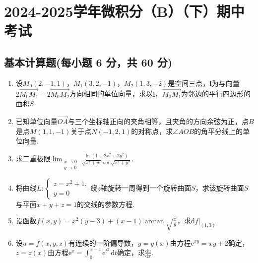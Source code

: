 \documentclass[../main.tex]{subfiles}
\begin{document}
\chapter{2024-2025学年微积分（B）（下）期中考试}

\section{基本计算题(每小题 6 分，共 60 分)}
\begin{enumerate}
    \item 设$M_{0}(2,-1,1)$，$M_{1}(3,2,-1)$，$M_{2}(1,3,-2)$是空间三点，$\boldsymbol
              {l}$为与向量$2\overrightarrow{M_0M_1}-2\overrightarrow{M_0M_2}$方向相同的单位向量，求以$\boldsymbol
              {l}$，$\overrightarrow{M_0M_1}$为邻边的平行四边形的面积$S$.
          \vspace{10em}

    \item 已知单位向量$\overrightarrow{OA}$与三个坐标轴正向的夹角相等，且夹角的方向余弦为正，点$B$是点$M
              (1,1,-1)$关于点$N(-1,2,1)$的对称点，求$\angle AOB$的角平分线上的单位向量.
          \vspace{10em}

    \item 求二重极限$\lim_{\substack{x\to 0 \\ y\to 0}}\frac{\ln\left(1+2x^{2}+2y^{2}\right)}{\sqrt{x^{2}+y^{2}}\sin\sqrt{x^{2}+y^{2}}}$.
          \vspace{10em}

    \item 将曲线$L:
              \begin{cases}
                  z=x^{2}+1, \\
                  y=0
              \end{cases}$绕$z$轴旋转一周得到一个旋转曲面$S$，求该旋转曲面$S$与平面$x+y+z
              =1$的交线的参数方程.
          \vspace{12em}

    \item 设函数$f(x,y)=x^{2}(y-3)+(x-1)\arctan\sqrt{\frac{x}{y}}$，求$\left.\mathrm{d}
              f\right|_{(1,3)}$.
          \vspace{12em}

    \item 设$u=f(x,y,z)$有连续的一阶偏导数，$y=y(x)$由方程$\mathrm{e}^{xy}=xy+2$确定，$z
              =z(x)$由方程$\mathrm{e}^{x} = \int_{0}^{x-z}\mathrm{e}^{t^2}\,\mathrm{d}t$确定，求$\frac{\mathrm{d}u}{\mathrm{d}x}$.
          \vspace{12em}


\end{enumerate}
\end{document}
